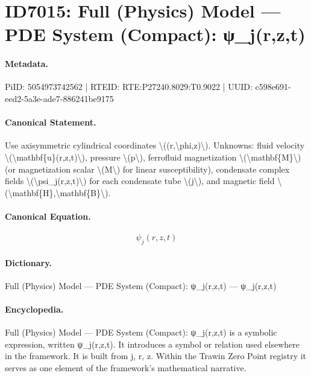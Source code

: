 \section*{ID7015: Full (Physics) Model — PDE System (Compact): ψ\_j(r,z,t)}
\paragraph{Metadata.}
PiID: 5054973742562 | RTEID: RTE:P27240.8029:T0.9022 | UUID: c598e691-eed2-5a3e-ade7-886241be9175

\paragraph{Canonical Statement.}
Use axisymmetric cylindrical coordinates \textbackslash{}((r,\textbackslash{}phi,z)\textbackslash{}). Unknowns: fluid velocity \textbackslash{}(\textbackslash{}mathbf\{u\}(r,z,t)\textbackslash{}), pressure \textbackslash{}(p\textbackslash{}), ferrofluid magnetization \textbackslash{}(\textbackslash{}mathbf\{M\}\textbackslash{}) (or magnetization scalar \textbackslash{}(M\textbackslash{}) for linear susceptibility), condensate complex fields \textbackslash{}(\textbackslash{}psi\_j(r,z,t)\textbackslash{}) for each condensate tube \textbackslash{}(j\textbackslash{}), and magnetic field \textbackslash{}(\textbackslash{}mathbf\{H\},\textbackslash{}mathbf\{B\}\textbackslash{}).

\paragraph{Canonical Equation.}
\[
\psi_j(r,z,t)
\]

\paragraph{Dictionary.}
Full (Physics) Model — PDE System (Compact): ψ\_j(r,z,t) — ψ\_j(r,z,t)

\paragraph{Encyclopedia.}
Full (Physics) Model — PDE System (Compact): ψ\_j(r,z,t) is a symbolic expression, written ψ\_j(r,z,t). It introduces a symbol or relation used elsewhere in the framework. It is built from j, r, z. Within the Trawin Zero Point registry it serves as one element of the framework's mathematical narrative.
